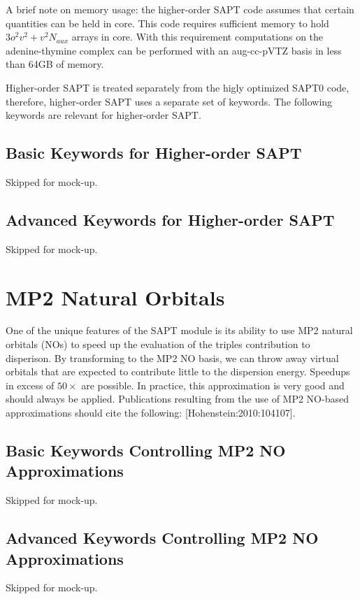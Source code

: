 \documentclass[letterpaper,10pt,english]{sphinxmanual}
\begin{document}
A brief note on memory usage: the higher-order SAPT code assumes that
certain quantities can be held in core. This code requires sufficient
memory to hold $3o^2v^2+v^2N_{aux}$ arrays in core. With this requirement
computations on the adenine-thymine complex can be performed with an
aug-cc-pVTZ basis in less than 64GB of memory.

Higher-order SAPT is treated separately from the higly optimized SAPT0
code, therefore, higher-order SAPT uses a separate set of keywords.
The following keywords are relevant for higher-order SAPT.


\subsection{Basic Keywords for Higher-order SAPT}
\label{index:basic-keywords-for-higher-order-sapt}
Skipped for mock-up.


\subsection{Advanced Keywords for Higher-order SAPT}
\label{index:advanced-keywords-for-higher-order-sapt}
Skipped for mock-up.


\section{MP2 Natural Orbitals}
\label{index:mp2-natural-orbitals}
One of the unique features of the SAPT module is its ability to use
MP2 natural orbitals (NOs) to speed up the evaluation of the triples
contribution to disperison. By transforming to the MP2 NO basis, we can
throw away virtual orbitals that are expected to contribute little to the
dispersion energy. Speedups in excess of $50 \times$ are possible. In
practice, this approximation is very good and should always be applied.
Publications resulting from the use of MP2 NO-based approximations should
cite the following: {[}Hohenstein:2010:104107{]}.


\subsection{Basic Keywords Controlling MP2 NO Approximations}
\label{index:basic-keywords-controlling-mp2-no-approximations}
Skipped for mock-up.


\subsection{Advanced Keywords Controlling MP2 NO Approximations}
\label{index:advanced-keywords-controlling-mp2-no-approximations}
Skipped for mock-up.
\end{document}
